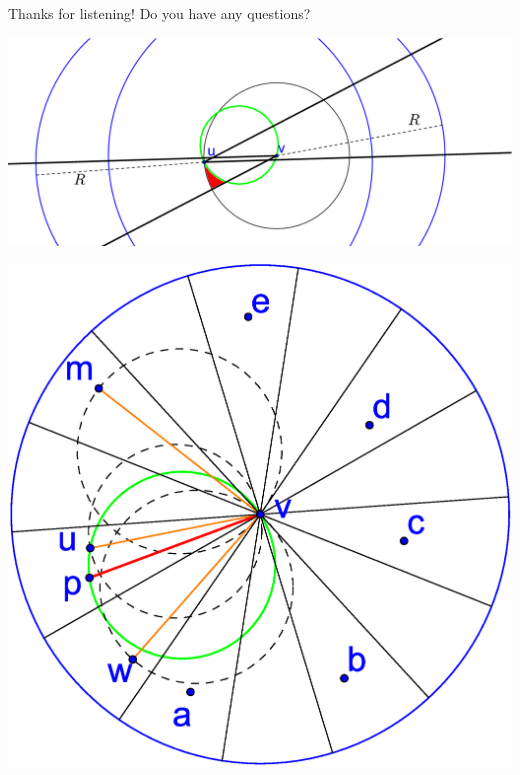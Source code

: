 \documentclass[compress]{beamer}
\begin{document}
\subsection{}
\begin{frame}
\center \Large Thanks for listening!
\center Do you have any questions?
\end{frame}

\begin{frame}
	\center \includegraphics[width=1\linewidth]{RMYS_case_error_bidirectional.eps}
\end{frame}

\begin{frame}
	\center \includegraphics[width=0.7\linewidth]{RMYS_case_one_cone_empty.eps}
\end{frame}
\end{document}
